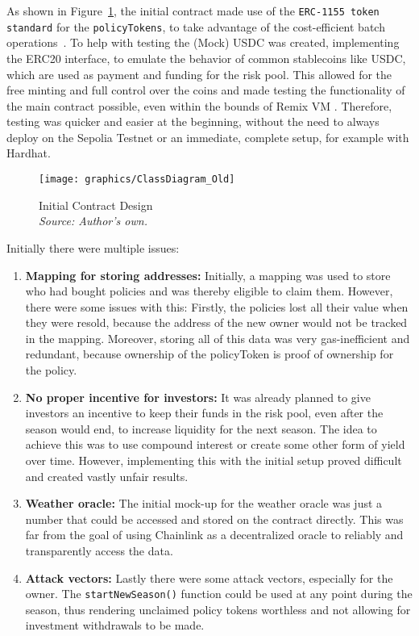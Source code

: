 \documentclass[11pt,a4paper]{article}
\begin{document}
		As shown in Figure~\ref{fig:initial-contract-design}, the initial contract made use of the \texttt{ERC-1155 token standard} for the \texttt{policyTokens}, to take advantage of the cost-efficient batch operations~\parencite{ERC1155}.
		To help with testing the (Mock) USDC\footnotemark{} was created, implementing the ERC20 interface, to emulate the behavior of common stablecoins like USDC, which are used as payment and funding for the risk pool. 
        This allowed for the free minting and full control over the coins and made testing the functionality of the main contract possible, even within the bounds of Remix VM .
        Therefore, testing was quicker and easier at the beginning, without the need to always deploy on the Sepolia Testnet or an immediate, complete setup, for example with Hardhat.

        \begin{figure}[htbp]
            \centering
            \texttt{[image: graphics/ClassDiagram\_Old]}
            \caption{Initial Contract Design \\ \textit{Source: Author's own.}}
            \label{fig:initial-contract-design}
        \end{figure}

        Initially there were multiple issues:

		\begin{enumerate}[1]
		\item \textbf{Mapping for storing addresses:} Initially, a mapping was used to store who had bought policies and was thereby eligible to claim them.
		However, there were some issues with this: Firstly, the policies lost all their value when they were resold, because the address of the new owner would not be tracked in the mapping.
		Moreover, storing all of this data was very gas-inefficient and redundant, because ownership of the policyToken is proof of ownership for the policy.
		\item \textbf{No proper incentive for investors:} It was already planned to give investors an incentive to keep their funds in the risk pool, even after the season would end, to increase liquidity for the next season.
		The idea to achieve this was to use compound interest or create some other form of yield over time.
		However, implementing this with the initial setup proved difficult and created vastly unfair results.
		\item \textbf{Weather oracle:} The initial mock-up for the weather oracle was just a number that could be accessed and stored on the contract directly.
		This was far from the goal of using Chainlink as a decentralized oracle to reliably and transparently access the data.
		\item \textbf{Attack vectors:} Lastly there were some attack vectors, especially for the owner.
		The \texttt{startNewSeason()} function could be used at any point during the season, thus rendering unclaimed policy tokens worthless and not allowing for investment withdrawals to be made.
		\end{enumerate}
\end{document}
